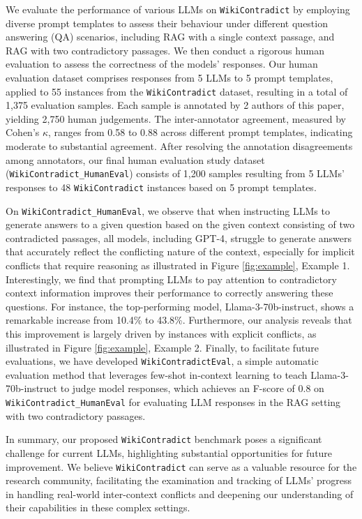\documentclass{article}
\begin{document}
We evaluate the performance of various LLMs on \texttt{WikiContradict} by employing diverse prompt templates to assess their behaviour under different question answering (QA) scenarios, including RAG with a single context passage, and RAG with two contradictory passages. We then conduct a rigorous human evaluation to assess the correctness of the models' responses. Our human evaluation dataset comprises responses from 5 LLMs to 5 prompt templates, applied to 55 instances from the \texttt{WikiContradict} dataset, resulting in a total of 1,375 evaluation samples. Each sample is annotated by 2 authors of this paper, yielding 2,750 human judgements. The inter-annotator agreement, measured by Cohen's $\kappa$, ranges from 0.58 to 0.88 across different prompt templates, indicating moderate to substantial agreement.
After resolving the annotation disagreements among annotators, our final human evaluation study dataset (\texttt{WikiContradict\_HumanEval}) consists of 1,200 samples resulting from 5 
LLMs' responses to 48 \texttt{WikiContradict} instances based on 5 prompt templates. 

On \texttt{WikiContradict\_HumanEval}, we observe that when instructing LLMs to generate answers to a given question based on the given context consisting of two contradicted passages, all
models, including GPT-4, struggle to generate answers that accurately reflect the conflicting nature of the context, especially for implicit conflicts that require reasoning as illustrated in Figure \ref {fig:example}, Example 1. Interestingly, we find that prompting LLMs to pay attention to contradictory context information improves their performance to correctly answering these questions. For instance, 
the top-performing model, Llama-3-70b-instruct, shows a remarkable increase from 10.4\% to 43.8\%. Furthermore, our analysis reveals that this improvement is largely driven by instances with explicit conflicts, as illustrated in Figure \ref{fig:example}, Example 2. Finally, to facilitate future evaluations, we have developed \texttt{WikiContradictEval}, a simple automatic evaluation method that leverages few-shot in-context learning to teach Llama-3-70b-instruct to judge model responses, which achieves an F-score of 0.8 on \texttt{WikiContradict\_HumanEval} for evaluating LLM responses in the RAG setting with two contradictory passages.

 In summary, our proposed \texttt{WikiContradict} benchmark poses a significant challenge for current LLMs, highlighting substantial opportunities for future improvement. We believe \texttt{WikiContradict} can serve as a valuable resource for the research community, facilitating the examination and tracking of LLMs' progress in handling real-world inter-context conflicts and deepening our understanding of their capabilities in these complex settings.
\end{document}
